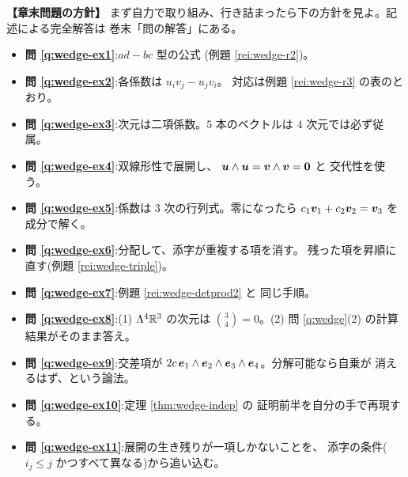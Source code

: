 \bigskip
{\small
\noindent\textbf{【章末問題の方針】}\quad
まず自力で取り組み、行き詰まったら下の方針を見よ。記述による完全解答は
巻末「問の解答」にある。
\begin{itemize}
\item \textbf{問 \ref{q:wedge-ex1}}:$ad - bc$ 型の公式
(例題 \ref{rei:wedge-r2})。
\item \textbf{問 \ref{q:wedge-ex2}}:各係数は $u_i v_j - u_j v_i$。
対応は例題 \ref{rei:wedge-r3} の表のとおり。
\item \textbf{問 \ref{q:wedge-ex3}}:次元は二項係数。$5$ 本のベクトルは
$4$ 次元では必ず従属。
\item \textbf{問 \ref{q:wedge-ex4}}:双線形性で展開し、
$\bm{u} \wedge \bm{u} = \bm{v} \wedge \bm{v} = \bm{0}$ と
交代性を使う。
\item \textbf{問 \ref{q:wedge-ex5}}:係数は $3$ 次の行列式。零になったら
$c_1\bm{v}_1 + c_2\bm{v}_2 = \bm{v}_3$ を成分で解く。
\item \textbf{問 \ref{q:wedge-ex6}}:分配して、添字が重複する項を消す。
残った項を昇順に直す(例題 \ref{rei:wedge-triple})。
\item \textbf{問 \ref{q:wedge-ex7}}:例題 \ref{rei:wedge-detprod2} と
同じ手順。
\item \textbf{問 \ref{q:wedge-ex8}}:(1) $\Lambda^4 \mathbb{R}^3$ の次元は
$\binom{3}{4} = 0$。(2) 問 \ref{q:wedge}(2) の計算結果がそのまま答え。
\item \textbf{問 \ref{q:wedge-ex9}}:交差項が $2c\,\bm{e}_1 \wedge
\bm{e}_2 \wedge \bm{e}_3 \wedge \bm{e}_4$。分解可能なら自乗が
消えるはず、という論法。
\item \textbf{問 \ref{q:wedge-ex10}}:定理 \ref{thm:wedge-indep} の
証明前半を自分の手で再現する。
\item \textbf{問 \ref{q:wedge-ex11}}:展開の生き残りが一項しかないことを、
添字の条件($i_j \le j$ かつすべて異なる)から追い込む。
\end{itemize}
}
